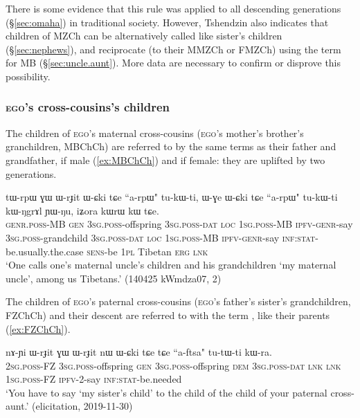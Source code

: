 There is some evidence that this rule was applied to all descending generations (§\ref{sec:omaha}) in traditional society. However, Tshendzin  also indicates that children of MZCh can be alternatively called  like sister's children (§\ref{sec:nephews}), and reciprocate (to their MMZCh or FMZCh) using the term for MB (§\ref{sec:uncle.aunt}). More data are necessary to confirm or disprove this possibility.

\subsubsection{\textsc{ego}'s cross-cousins's children} \label{sec:MBCh.FZCh.Ch}
The children of \textsc{ego}'s maternal cross-cousins (\textsc{ego}'s mother's brother's granchildren, MBChCh) are referred to by the same terms as their father and grandfather,  if male (\ref{ex:MBChCh}) and  if female: they are uplifted by two generations.

\begin{exe}
\ex \label{ex:MBChCh}
\gll tɯ-rpɯ ɣɯ ɯ-rɟit ɯ-ɕki tɕe ``a-rpɯ" tu-kɯ-ti, ɯ-ɣe ɯ-ɕki tɕe ``a-rpɯ" tu-kɯ-ti kɯ-ŋgrɤl ɲɯ-ŋu, iʑora kɯrɯ kɯ tɕe. \\
\textsc{genr}.\textsc{poss}-MB \textsc{gen} \textsc{3sg}.\textsc{poss}-offspring \textsc{3sg}.\textsc{poss}-\textsc{dat} \textsc{loc} \textsc{1sg}.\textsc{poss}-MB \textsc{ipfv}-\textsc{genr}-say \textsc{3sg}.\textsc{poss}-grandchild \textsc{3sg}.\textsc{poss}-\textsc{dat} \textsc{loc} \textsc{1sg}.\textsc{poss}-MB \textsc{ipfv}-\textsc{genr}-say  \textsc{inf}:\textsc{stat}-be.usually.the.case \textsc{sens}-be \textsc{1pl} Tibetan \textsc{erg} \textsc{lnk} \\
\glt `One calls one's maternal uncle's children and his grandchildren  `my maternal uncle', among us Tibetans.' (140425 kWmdza07, 2)
\end{exe}

The children of \textsc{ego}'s paternal cross-cousins (\textsc{ego}'s father's sister's grandchildren, FZChCh) and their descent are referred to with the term , like their parents (\ref{ex:FZChCh}).

\begin{exe}
\ex \label{ex:FZChCh}
\gll nɤ-ɲi ɯ-rɟit ɣɯ ɯ-rɟit nɯ ɯ-ɕki tɕe tɕe ``a-ftsa" tu-tɯ-ti kɯ-ra. \\
\textsc{2sg}.\textsc{poss}-FZ \textsc{3sg}.\textsc{poss}-offspring \textsc{gen} \textsc{3sg}.\textsc{poss}-offspring \textsc{dem} \textsc{3sg}.\textsc{poss}-\textsc{dat} \textsc{lnk} \textsc{lnk} \textsc{1sg}.\textsc{poss}-FZ \textsc{ipfv}-2-say \textsc{inf}:\textsc{stat}-be.needed \\
\glt `You have to say  `my sister's child' to the child of the child of your paternal cross-aunt.' (elicitation, 2019-11-30)
\end{exe}


